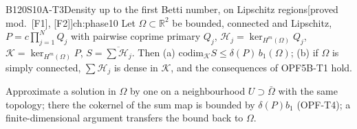 \documentclass[11pt,a4paper,oneside]{report}
\newcommand{\badge}[2]{\textcolor{#1}{\textsf{\footnotesize[#2]}}}
\newcommand{\modulo}[1]{\badge{cD}{proved mod.\ #1}}
\newcommand{\R}{\mathbb{R}}\newcommand{\C}{\mathbb{C}}\newcommand{\N}{\mathbb{N}}\newcommand{\Z}{\mathbb{Z}}\newcommand{\Q}{\mathbb{Q}}
\newenvironment{dimcard}[5]{\par\Needspace{12\baselineskip}\begin{dimcardbox}{#1}{#2}{#3}{#4}{#5}}{\end{dimcardbox}}
\begin{document}
\begin{dimcard}{B120}{S10A-T3}{Density up to the first Betti number, on Lipschitz regions}{\modulo{[F1], [F2]}}{ch:phase10}
Let $\Omega\subset\R^2$ be bounded, connected and Lipschitz, $P=c\prod_{j=1}^NQ_j$ with pairwise coprime primary $Q_j$, $\mathcal H_j=\ker_{H^m(\Omega)}Q_j$, $\mathcal K=\ker_{H^m(\Omega)}P$, $S=\overline{\sum\mathcal H_j}$. Then (a) $\mathrm{codim}_{\mathcal K}S\le\delta(P)\,b_1(\Omega)$; (b) if $\Omega$ is simply connected, $\sum\mathcal H_j$ is dense in $\mathcal K$, and the consequences of OPF5B-T1 hold.
\end{dimcard}

\begin{proofidea}
Approximate a solution in $\Omega$ by one on a neighbourhood $U\supset\bar\Omega$ with the same topology; there the cokernel of the sum map is bounded by $\delta(P)b_1$ (OPF-T4); a finite-dimensional argument transfers the bound back to $\Omega$.
\end{proofidea}
\end{document}
